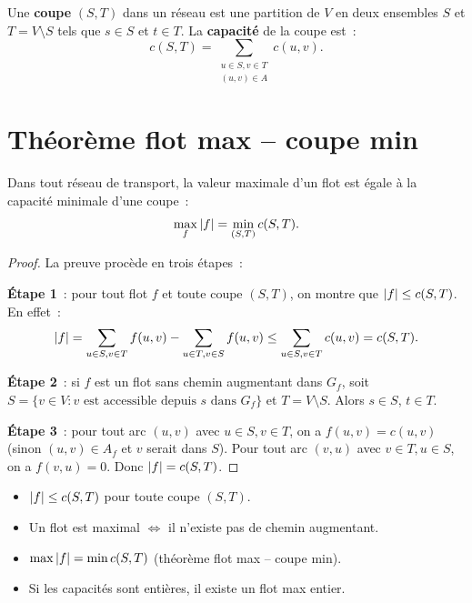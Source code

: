 \begin{definition}[Coupe]
Une \textbf{coupe} $(S, T)$ dans un r\'eseau est une partition de $V$ en deux
ensembles $S$ et $T = V \setminus S$ tels que $s \in S$ et $t \in T$. La
\textbf{capacit\'e} de la coupe est~:
\[
  c(S, T) = \sum_{\substack{u \in S, v \in T \\ (u,v) \in A}} c(u,v).
\]
\end{definition}

\section{Th\'eor\`eme flot max -- coupe min}

\begin{theoreme}
\label{thm:maxflow_mincut}
Dans tout r\'eseau de transport, la valeur maximale d'un flot est \'egale \`a la
capacit\'e minimale d'une coupe~:
\[
  \max_f \left| f \right| = \min_{(S,T)} c(S, T).
\]
\end{theoreme}

\begin{proof}
La preuve proc\`ede en trois \'etapes~:

\textbf{\'Etape 1}~: pour tout flot $f$ et toute coupe $(S, T)$, on montre que
$\left| f \right| \leq c(S, T)$. En effet~:
\[
  \left| f \right| = \sum_{\substack{u \in S, v \in T}} f(u,v)
          - \sum_{\substack{u \in T, v \in S}} f(u,v)
          \leq \sum_{\substack{u \in S, v \in T}} c(u,v) = c(S, T).
\]

\textbf{\'Etape 2}~: si $f$ est un flot sans chemin augmentant dans $G_f$,
soit $S = \{v \in V : v \text{ est accessible depuis } s \text{ dans } G_f\}$
et $T = V \setminus S$. Alors $s \in S$, $t \in T$.

\textbf{\'Etape 3}~: pour tout arc $(u,v)$ avec $u \in S, v \in T$, on a
$f(u,v) = c(u,v)$ (sinon $(u,v) \in A_f$ et $v$ serait dans $S$). Pour tout
arc $(v,u)$ avec $v \in T, u \in S$, on a $f(v,u) = 0$. Donc
$\left| f \right| = c(S, T)$.
\end{proof}

\begin{formules}[title=\textbf{Propri\'et\'es fondamentales des flots}]
\begin{itemize}
  \item $\left| f \right| \leq c(S,T)$ pour toute coupe $(S,T)$.
  \item Un flot est maximal $\iff$ il n'existe pas de chemin augmentant.
  \item $\max \left| f \right| = \min c(S,T)$ (th\'eor\`eme flot max -- coupe min).
  \item Si les capacit\'es sont enti\`eres, il existe un flot max entier.
\end{itemize}
\end{formules}

